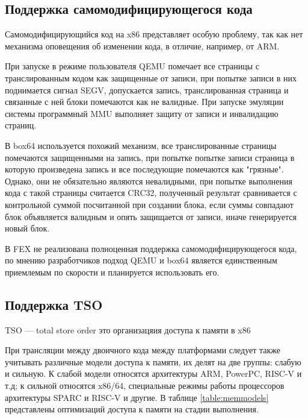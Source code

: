 \newpage

\subsection{Поддержка самомодифицирующегося кода}

Самомодифицирующийся код на x86 представляет особую проблему, так как нет механизма оповещения об изменении кода, в отличие, например, от ARM.

При запуске в режиме пользователя QEMU помечает все страницы с транслированным кодом как защищенные от записи, при попытке записи в них поднимается сигнал SEGV, допускается запись, транслированная страница и связанные с ней блоки помечаются как не валидные. При запуске эмуляции системы программный MMU выполняет защиту от записи и инвалидацию страниц. \cite{qemu_docs}

В box64 используется похожий механизм, все транслированные страницы помечаются защищенными на запись, при попытке попытке записи страница в которую произведена запись и все последующие помечаются как "грязные". Однако, они не обязательно являются невалидными, при попытке выполнения кода с такой страницы считается CRC32, полученный результат сравнивается с контрольной суммой посчитанной при создании блока, если суммы совпадают блок объявляется валидным и опять защищается от записи, иначе генерируется новый блок. \cite{box64_letter}

В FEX не реализована полноценная поддержка самомодифицирующегося кода, по мнению разработчиков подход QEMU и box64 является единственным приемлемым по скорости и планируется использовать его. \cite{FEX_letter}

\subsection{Поддержка TSO}

TSO --- total store order это организацяия доступа к памяти в x86

При трансляции между двоичного кода между платформами следует также учитывать различные модели доступа к памяти, их делят на две группы: слабую и сильную. К слабой модели относятся архитектуры ARM, PowerPC, RISC-V и т.д; к сильной относятся x86/64, специальные режимы работы процессоров архитектуры SPARC и RISC-V и другие. В таблице \ref{table:memmodels} представлены оптимизаций доступа к памяти на стадии выполнения.

